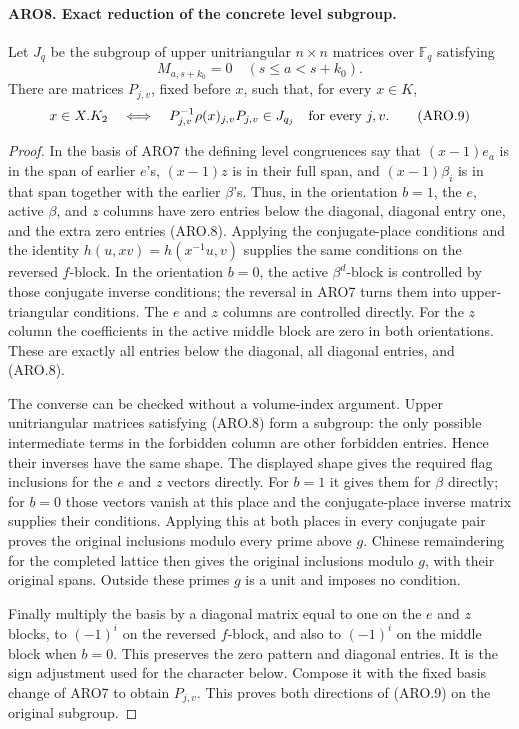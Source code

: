\documentclass[11pt,a4paper]{article}
\numberwithin{equation}{section}
\theoremstyle{remark}\newtheorem{remark}[theorem]{Remark}
\begin{document}
\paragraph{ARO8. Exact reduction of the concrete level subgroup.}
\label{claim:ARO8}
Let \(J_q\) be the subgroup of upper unitriangular
\(n\times n\) matrices over \(\mathbb F_q\) satisfying
\[
                  M_{a,s+k_0}=0\quad(s\leq a<s+k_0).
 \tag{ARO.8}
\]
There are matrices \(P_{j,v}\), fixed before \(x\), such that,
for every \(x\in K\),
\[
 x\in X.K_2\quad\Longleftrightarrow\quad
 P_{j,v}^{-1}\rho(x)_{j,v}P_{j,v}\in J_{q_j}
                    \quad\hbox{for every }j,v.       \tag{ARO.9}
\]
\begin{proof}
In the basis of ARO7 the defining level congruences say that
\((x-1)e_a\) is in the span of earlier \(e\)'s,
\((x-1)z\) is in their full span, and
\((x-1)\beta_i\) is in that span together with the earlier
\(\beta\)'s.  Thus, in the orientation \(b=1\), the \(e\),
active \(\beta\), and \(z\) columns have zero entries below the
diagonal, diagonal entry one, and the extra zero entries (ARO.8).
Applying the conjugate-place conditions and the identity
\(h(u,xv)=h(x^{-1}u,v)\) supplies the same conditions on the
reversed \(f\)-block.  In the orientation \(b=0\), the active
\(\beta^d\)-block is controlled by those conjugate inverse
conditions; the reversal in ARO7 turns them into upper-triangular
conditions.  The \(e\) and \(z\) columns are controlled directly.
For the \(z\) column the coefficients in the active middle block
are zero in both orientations.  These are exactly all entries below
the diagonal, all diagonal entries, and (ARO.8).

The converse can be checked without a volume-index argument.
Upper unitriangular matrices satisfying (ARO.8) form a subgroup:
the only possible intermediate terms in the forbidden column are
other forbidden entries.  Hence their inverses have the same shape.
The displayed shape gives the required flag inclusions for the
\(e\) and \(z\) vectors directly.  For \(b=1\) it gives them for
\(\beta\) directly; for \(b=0\) those vectors vanish at this
place and the conjugate-place inverse matrix supplies their
conditions.  Applying this at both places in every conjugate pair
proves the original inclusions modulo every prime above \(g\).
Chinese remaindering for the completed lattice then gives the
original inclusions modulo \(g\), with their original spans.
Outside these primes \(g\) is a unit and imposes no condition.

Finally multiply the basis by a diagonal matrix equal to one on
the \(e\) and \(z\) blocks, to \((-1)^i\) on the reversed
\(f\)-block, and also to \((-1)^i\) on the middle block when
\(b=0\).  This preserves the zero pattern and diagonal entries.
It is the sign adjustment used for the character below.  Compose
it with the fixed basis change of ARO7 to obtain \(P_{j,v}\).
This proves both directions of (ARO.9) on the original subgroup.
\end{proof}
\end{document}
